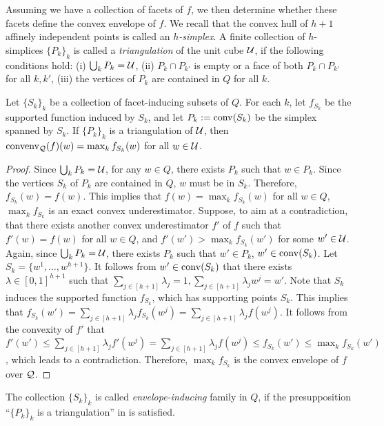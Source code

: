 Assuming we have a collection of facets of $f$, we then determine whether these facets define the convex envelope of $f$. We recall that the convex hull of $h+1$ affinely independent points is called an  \emph{$h$-simplex}.
A finite collection of $h$-simplices $\{P_k\}_k$ is called a \emph{triangulation} of the unit cube $\mathcal U$, if the following conditions hold: (i) $\bigcup_{k} P_k = \mathcal U$, (ii)  $P_k \cap P_{k'}$ is empty or a face of both $P_k \cap P_{k'}$ for all $k, k'$, (iii) the vertices of $P_k$ are contained in $Q$ for all $k$.


\begin{proposition}\label{prop.triangle}
Let $\{S_k\}_{k}$ be a collection of facet-inducing subsets of $Q$. For each $k$, let $f_{S_k}$ be the supported function induced by $S_k$, and let $P_k:= \operatorname{conv}(S_k)$ be the simplex spanned by $S_k$. If  $\{P_k\}_k$ is  a triangulation of $\mathcal U$, then $\operatorname{convenv}_{\mathcal Q}(f)(w) = \max_{k} f_{S_k}(w)$ for all $w \in \mathcal U$.
\end{proposition}
\begin{proof}
Since $\bigcup_{k} P_k = \mathcal U$, for any $w \in Q$, there exists $P_k$ such that $w \in P_k$. Since the vertices $S_k$ of $P_k$ are contained in $Q$, $w$ must be in $S_k$. Therefore, $f_{S_k}(w) = f(w)$.
This implies that $f(w) = \max_{k} f_{S_k}(w)$ for all $w \in Q$, \ie $ \max_{k} f_{S_k}$ is an exact convex underestimator. Suppose, to aim at a contradiction, that there exists another convex underestimator $f'$ of $f$ such that $f'(w) = f(w)$ for all $w \in Q$, and $f'(w') > \max_{k} f_{S_k}(w')$ for some $w' \in \mathcal U$.  Again, since $\bigcup_{k} P_k = \mathcal U$, there exists $P_k$ such that $w' \in P_k$, \ie $w' \in \operatorname{conv}(S_k)$. Let $S_k = \{w^1,\dots,w^{h+1}\}$. It follows from $w' \in \operatorname{conv}(S_k)$ that there exists $\lambda \in [0,1]^{h+1}$ such that $\sum_{j \in [h+1]}\lambda_j=1,\sum_{j \in [h+1]}\lambda_j w^j = w'$. Note that $S_k$ induces the supported function $f_{S_k}$, which has supporting points $S_k$. This implies that $f_{S_k}(w') = \sum_{j \in [h+1]}\lambda_j f_{S_k}(w^j) = \sum_{j \in [h+1]}\lambda_j f(w^j)$. It follows from the convexity of $f'$ that $f'(w') \le \sum_{j \in [h+1]}\lambda_j f'(w^j) = \sum_{j \in [h+1]}\lambda_j f(w^j) \le f_{S_k}(w') \le  \max_{k} f_{S_k}(w')$, which leads to a contradiction. Therefore, $ \max_{k} f_{S_k}$ is the convex envelope of $f$ over $\mathcal Q$.
\end{proof}

The collection $\{S_k\}_{k}$ is called  \emph{envelope-inducing} family in $Q$, if the presupposition ``$\{P_k\}_k$ is  a triangulation'' in   is satisfied.


